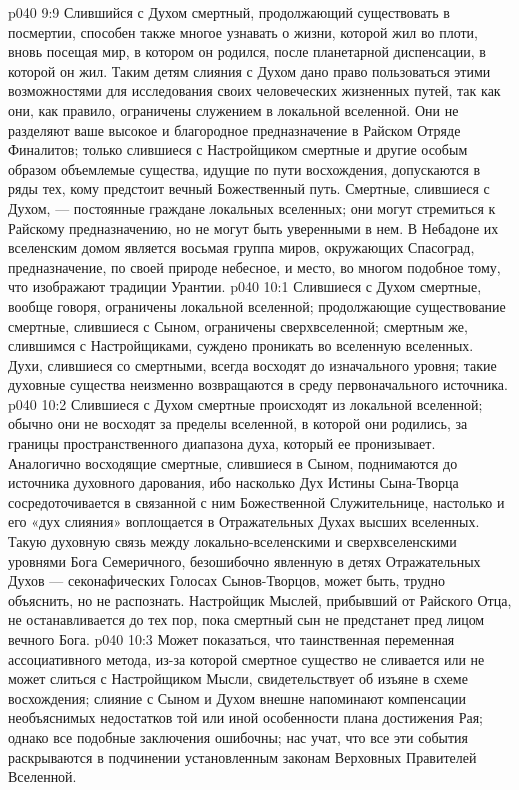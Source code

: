 \vs p040 9:9 \pc Слившийся с Духом смертный, продолжающий существовать в посмертии, способен также многое узнавать о жизни, которой жил во плоти, вновь посещая мир, в котором он родился, после планетарной диспенсации, в которой он жил. Таким детям слияния с Духом дано право пользоваться этими возможностями для исследования своих человеческих жизненных путей, так как они, как правило, ограничены служением в локальной вселенной. Они не разделяют ваше высокое и благородное предназначение в Райском Отряде Финалитов; только слившиеся с Настройщиком смертные и другие особым образом объемлемые существа, идущие по пути восхождения, допускаются в ряды тех, кому предстоит вечный Божественный путь. Смертные, слившиеся с Духом, --- постоянные граждане локальных вселенных; они могут стремиться к Райскому предназначению, но не могут быть уверенными в нем. В Небадоне их вселенским домом является восьмая группа миров, окружающих Спасоград, предназначение, по своей природе небесное, и место, во многом подобное тому, что изображают традиции Урантии.
\vs p040 10:1 Слившиеся с Духом смертные, вообще говоря, ограничены локальной вселенной; продолжающие существование смертные, слившиеся с Сыном, ограничены сверхвселенной; смертным же, слившимся с Настройщиками, суждено проникать во вселенную вселенных. Духи, слившиеся со смертными, всегда восходят до изначального уровня; такие духовные существа неизменно возвращаются в среду первоначального источника.
\vs p040 10:2 Слившиеся с Духом смертные происходят из локальной вселенной; обычно они не восходят за пределы вселенной, в которой они родились, за границы пространственного диапазона духа, который ее пронизывает. Аналогично восходящие смертные, слившиеся в Сыном, поднимаются до источника духовного дарования, ибо насколько Дух Истины Сына\hyp{}Творца сосредоточивается в связанной с ним Божественной Служительнице, настолько и его «дух слияния» воплощается в Отражательных Духах высших вселенных. Такую духовную связь между локально\hyp{}вселенскими и сверхвселенскими уровнями Бога Семеричного, безошибочно явленную в детях Отражательных Духов --- секонафических Голосах Сынов\hyp{}Творцов, может быть, трудно объяснить, но не распознать. Настройщик Мыслей, прибывший от Райского Отца, не останавливается до тех пор, пока смертный сын не предстанет пред лицом вечного Бога.
\vs p040 10:3 \pc Может показаться, что таинственная переменная ассоциативного метода, из\hyp{}за которой смертное существо не сливается или не может слиться с Настройщиком Мысли, свидетельствует об изъяне в схеме восхождения; слияние с Сыном и Духом внешне напоминают компенсации необъяснимых недостатков той или иной особенности плана достижения Рая; однако все подобные заключения ошибочны; нас учат, что все эти события раскрываются в подчинении установленным законам Верховных Правителей Вселенной.
